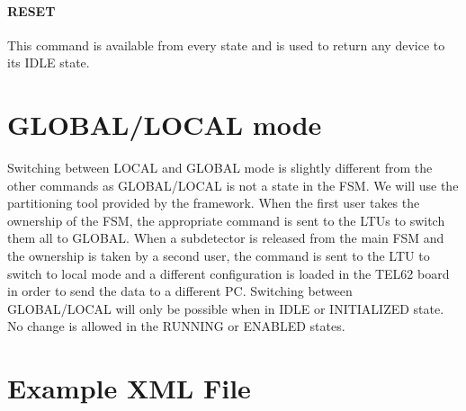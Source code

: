 \documentclass[a4paper]{article}
\begin{document}
\paragraph{RESET} This command is available from every state and is used to return any device to its IDLE state.


\section{GLOBAL/LOCAL mode}
Switching between LOCAL and GLOBAL mode is slightly different from the other commands as GLOBAL/LOCAL is not a state in the FSM. We will use the partitioning tool provided by the framework. When the first user takes the ownership of the FSM, the appropriate command is sent to the LTUs to switch them all to GLOBAL. When a subdetector is released from the main FSM and the ownership is taken by a second user, the command is sent to the LTU to switch to local mode and a different configuration is loaded in the TEL62 board in order to send the data to a different PC. Switching between GLOBAL/LOCAL will only be possible when in IDLE or INITIALIZED state. No change is allowed in the RUNNING or ENABLED states.

\newpage

\section{Example XML File}

\end{document}
